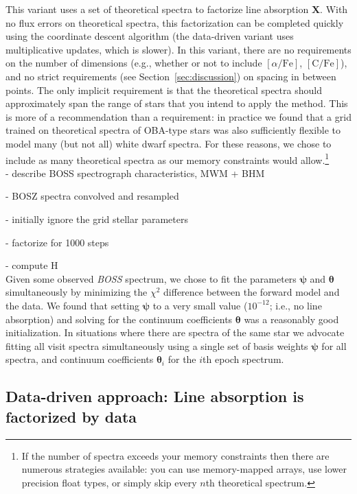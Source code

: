 \documentclass[modern]{aastex631}
\newcommand{\vectheta}{\boldsymbol{\theta}}
\newcommand{\vecpsi}{\boldsymbol{\psi}}
\newcommand{\vecX}{\mathbf{X}}
\begin{document}
This variant uses a set of theoretical spectra to factorize line absorption $\vecX$. With no flux errors on theoretical spectra, this factorization can be completed quickly using the coordinate descent algorithm (the data-driven variant uses multiplicative updates, which is slower). In this variant, there are no requirements on the number of dimensions (e.g., whether or not to include $[\alpha/\mathrm{Fe}]$, $[\mathrm{C/Fe}]$), and no strict requirements (see Section~\ref{sec:discussion}) on spacing in between points. The only implicit requirement is that the theoretical spectra should approximately span the range of stars that you intend to apply the method. This is more of a recommendation than a requirement: in practice we found that a grid trained on theoretical spectra of OBA-type stars was also sufficiently flexible to model many (but not all) white dwarf spectra. For these reasons, we chose to include as many theoretical spectra as our memory constraints would allow.\footnote{If the number of spectra exceeds your memory constraints then there are numerous strategies available: you can use memory-mapped arrays, use lower precision float types, or simply skip every $n$th theoretical spectrum.}\\

- describe BOSS spectrograph characteristics, MWM + BHM

- BOSZ spectra convolved and resampled 

- initially ignore the grid stellar parameters 

- factorize for 1000 steps

- compute H\\

Given some observed \emph{BOSS} spectrum, we chose to fit the parameters $\vecpsi$ and $\vectheta$ simultaneously by minimizing the $\chi^2$ difference between the forward model and the data. We found that setting $\vecpsi$ to a very small value ($10^{-12}$; i.e., no line absorption) and solving for the continuum coefficients $\vectheta$ was a reasonably good initialization. In situations where there are spectra of the same star we advocate fitting all visit spectra simultaneously using a single set of basis weights $\vecpsi$ for all spectra, and continuum coefficients $\vectheta_i$ for the $i$th epoch spectrum. 


\subsection{Data-driven approach: Line absorption is factorized by data}
\label{sec:data-method}
\end{document}
